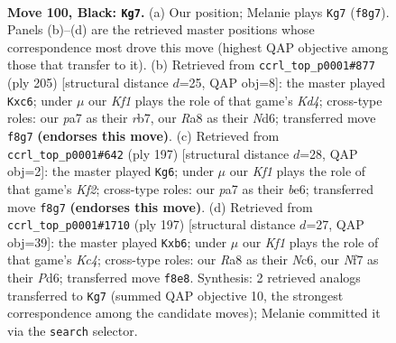 \documentclass[11pt]{article}
\begin{document}
\clearpage

\begin{figure}[p]\centering
\begin{subfigure}{0.46\textwidth}\centering
\resizebox{\linewidth}{!}{%
\newchessgame
\chessboard[
  setfen={r4k2/PR3n2/8/6P1/5K2/7P/2P1B3/8 b - - 0 100},
  showmover=false,
  pgfstyle=straightmove, color=movearrow, markmove={f8-g7}
]}
\caption{}
\end{subfigure}\hfill
\begin{subfigure}{0.46\textwidth}\centering
\resizebox{\linewidth}{!}{%
\newchessgame
\chessboard[
  setfen={8/PR6/2Pn4/3k4/3P4/2K5/r7/8 b - - 0 103},
  showmover=false,
  pgfstyle=straightmove, color=movearrow, markmove={d5-c6}
]}
\caption{}
\end{subfigure}
\\[4pt]
\begin{subfigure}{0.46\textwidth}\centering
\resizebox{\linewidth}{!}{%
\newchessgame
\chessboard[
  setfen={8/1r3k2/R3Bn1p/8/6P1/5P2/5K2/8 b - - 56 99},
  showmover=false,
  pgfstyle=straightmove, color=movearrow, markmove={f7-g6}
]}
\caption{}
\end{subfigure}\hfill
\begin{subfigure}{0.46\textwidth}\centering
\resizebox{\linewidth}{!}{%
\newchessgame
\chessboard[
  setfen={r7/P2R4/1Pnp4/2k5/8/8/1K6/8 b - - 4 99},
  showmover=false,
  pgfstyle=straightmove, color=movearrow, markmove={c5-b6}
]}
\caption{}
\end{subfigure}
\caption{\textbf{Move 100, Black: \texttt{Kg7}.} (a) Our position; Melanie plays \texttt{Kg7} (\texttt{f8g7}). Panels (b)--(d) are the retrieved master positions whose correspondence most drove this move (highest QAP objective among those that transfer to it). (b) Retrieved from \texttt{ccrl\_top\_p0001\#877} (ply 205) [structural distance $d$=25, QAP obj=8]: the master played \texttt{Kxc6}; under $\mu$ our \emph{Kf1} plays the role of that game's \emph{Kd4}; cross-type roles: our \emph{p}a7 as their \emph{r}b7, our \emph{R}a8 as their \emph{N}d6; transferred move \texttt{f8g7} \textbf{(endorses this move)}. (c) Retrieved from \texttt{ccrl\_top\_p0001\#642} (ply 197) [structural distance $d$=28, QAP obj=2]: the master played \texttt{Kg6}; under $\mu$ our \emph{Kf1} plays the role of that game's \emph{Kf2}; cross-type roles: our \emph{p}a7 as their \emph{b}e6; transferred move \texttt{f8g7} \textbf{(endorses this move)}. (d) Retrieved from \texttt{ccrl\_top\_p0001\#1710} (ply 197) [structural distance $d$=27, QAP obj=39]: the master played \texttt{Kxb6}; under $\mu$ our \emph{Kf1} plays the role of that game's \emph{Kc4}; cross-type roles: our \emph{R}a8 as their \emph{N}c6, our \emph{N}f7 as their \emph{P}d6; transferred move \texttt{f8e8}. Synthesis: 2 retrieved analogs transferred to \texttt{Kg7} (summed QAP objective 10, the strongest correspondence among the candidate moves); Melanie committed it via the \texttt{search} selector.}
\label{fig:thought-m199}
\end{figure}
\end{document}
